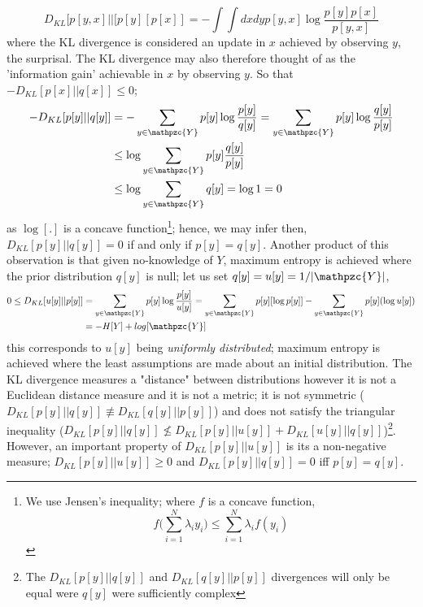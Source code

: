 \documentclass[7pt]{article}
\begin{document}
$$
D_{KL} [p[y,x]||[p[y][p[x]] =  - \int \int dx dy p[y,x] \log \dfrac{ p[y]p[x] }{p[y,x] }
$$
where the KL divergence is considered an update in $x$ achieved by observing $y$, the surprisal. The KL divergence may also therefore thought of as the 'information gain' achievable in $x$ by observing $y$. So that $-D_{KL} [p[x]||q[x]] \leq 0$;
\begin{equation}
\begin{split}
-D_{KL} [p[y]||q[y]] & = - \sum_{y\in\mathpzc{Y}} p[y] \log\dfrac{p[y] }{q[y] } = \sum_{y\in\mathpzc{Y}} p[y]  \log\dfrac{q[y]}{p[y]} \\
& \leq \log \sum_{y\in\mathpzc{Y}} p[y] \dfrac{q[y]}{p[y]} \\
& \leq \log \sum_{y\in\mathpzc{Y}} {q[y]} = \log 1 = 0  \\
\end{split}
\end{equation}
as $\log[.]$ is a concave function\footnote{We use Jensen's inequality; where $f$ is a concave function, $$ f \Bigr( \sum_{i=1}^N \lambda_i y_i \Bigr) \leq \sum_{i=1}^N \lambda_i f(y_i)$$ }; hence, we may infer then, $D_{KL} [p[y]||q[y]] = 0$ if and only if $p[y] = q[y]$. Another product of this observation is that given no-knowledge of $Y$, maximum entropy is achieved where the prior distribution $q[y]$ is null; let us set $q[y] = u[y] = 1/|\mathpzc{Y}|$,
\begin{equation}
\begin{split}
0 \leq  D_{KL} [u[y]||p[y]] & = \sum_{y\in\mathpzc{Y}} {p[y]} \log\dfrac{p[y] }{u[y] } = \sum_{y\in\mathpzc{Y}} {p[y]} [\log p[y]] - \sum_{y\in\mathpzc{Y}} {p[y]} (\log u[y])\\
& = -H[Y] + log[\mathpzc{Y}]
\end{split}
\end{equation}
this corresponds to $u[y]$ being  \emph{uniformly distributed}; maximum entropy is achieved where the least assumptions are made about an initial distribution. The KL divergence measures a "distance" between distributions however it is not a Euclidean distance measure and it is not a metric; it is not symmetric ($D_{KL} [p[y]||q[y]] \not\equiv D_{KL} [q[y]||p[y]]$) and does not satisfy the triangular inequality ($D_{KL} [p[y]||q[y]] \not\leq D_{KL} [p[y]||u[y]] + D_{KL} [u[y]||q[y]]  $)\footnote{The $D_{KL} [p[y]||q[y]]$ and $D_{KL} [q[y]||p[y]]$ divergences will only be equal were $q[y]$ were sufficiently complex}. However, an important property of $D_{KL} [p[y]||u[y]]$ is its  a non-negative measure;  $D_{KL} [p[y]||u[y]] \geq 0$ and $D_{KL} [p[y]||q[y]] = 0$ iff $p[y] = q[y]$.
\end{document}
